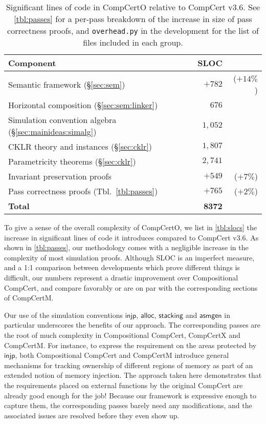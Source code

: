 \documentclass[sigplan,10pt,review]{acmart}
\newcommand{\figsize}{\small}
\newcommand{\kw}[1]{\ensuremath{ \mathsf{#1} }}
\begin{document}
\begin{table} %
  \caption{Significant lines of code in CompCertO
    relative to CompCert v$3.6$.
    See \autoref{tbl:passes}
    for a per-pass breakdown of the increase in size
    of pass correctness proofs,
    and \texttt{overhead.py} in the development
    for the list of files included in each group.}
  \label{tbl:slocs}
  \figsize
  \begin{tabular}{lrr}
    \hline
    Component & SLOC & \\ %
    \hline
    Semantic framework (\S\ref{sec:sem}) & $+782$ & ($+14\%$) \\
    Horizontal composition (\S\ref{sec:sem:linker}) & $676$ & \\
    Simulation convention algebra (\S\ref{sec:mainideas:simalg}) & $1{,}052$ & \\
    CKLR theory and instances (\S\ref{sec:cklr}) & $1{,}807$ & \\
    Parametricity theorems (\S\ref{sec:cklr}) & $2{,}741$ & \\
    Invariant preservation proofs & $+549$ & ($+7\%$) \\
    Pass correctness proofs (Tbl.~\ref{tbl:passes}) & $+765$ & ($+2\%$) \\
    \textbf{Total} & \textbf{8372} & \\
    \hline
  \end{tabular}
\end{table}

To give a sense of the overall complexity of CompCertO,
we list in \autoref{tbl:slocs}
the increase in significant lines of code it introduces
compared to CompCert v$3.6$.
As shown in \autoref{tbl:passes},
our methodology comes with a negligible increase
in the complexity of most simulation proofs.
Although SLOC is an imperfect measure,
and a 1:1 comparison between developments which
prove different things is difficult,
our numbers represent
a drastic improvement over Compositional CompCert,
and compare favorably
or are on par with
the corresponding sections of CompCertM.

Our use of the simulation conventions
\kw{injp}, \kw{alloc}, \kw{stacking} and \kw{asmgen}
in particular
underscores the benefits of our approach.
The corresponding passes are the root of
much complexity
in Compositional CompCert, CompCertX and CompCertM.
For instance,
to express the requirement on
the areas protected by \kw{injp},
both Compositional CompCert and CompCertM
introduce general mechanisms for tracking ownership of
different regions of memory
as part of an extended notion of memory injection.
The approach taken here demonstrates that
the requirements placed on external functions
by the original CompCert
are already good enough for the job!
Because our framework is expressive enough to capture them,
the corresponding passes barely need any modifications,
and the associated issues are resolved before they even show up.
\end{document}
